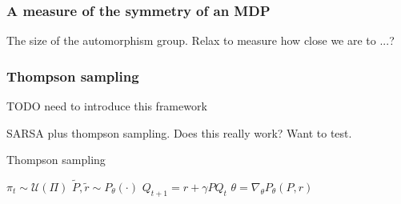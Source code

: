 %
%
%
%
%
%


\subsubsection{A measure of the symmetry of an MDP}

The size of the automorphism group.
Relax to measure how close we are to ...?


\subsubsection{Thompson sampling} \label{thompson-sampling}

{\color{red}TODO need to introduce this framework}

SARSA plus thompson sampling. Does this really work? Want to test.

\begin{algorithm}
	\caption{Thompson sampling}
	\begin{algorithmic}[1]

		\State $\pi_t \sim \mathcal U(\Pi)$
		\State $\tilde P, \tilde r \sim P_{\theta}(\cdot)$
		\State $Q_{t+1} =  r + \gamma P Q_t$ 
		\State $\theta = \nabla_{\theta} P_{\theta}(P, r)$ 

		\EndWhile
		\State \algorithmicreturn{ $\pi$}
		\EndProcedure

	\end{algorithmic}
\end{algorithm}

